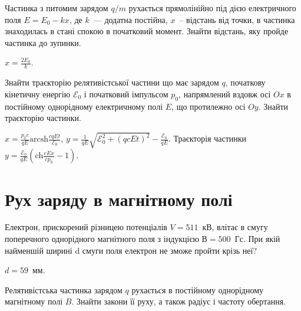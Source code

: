 \begin{problem}
Частинка з питомим зарядом $q/m$ рухається  прямолінійно під дією електричного поля $E = E_0 - kx$, де $k$~--- додатна постійна, $x$~-- відстань від точки, в частинка знаходилась в стані спокою в початковий момент. Знайти відстань, яку пройде частинка до зупинки.
\begin{solution}
	$x = \frac{2E_0}{k}$.
\end{solution}
\end{problem}

\begin{problem}
Знайти траєкторію релятивістської частини що має зарядом $q$, початкову кінетичну енергію $\mathcal{E}_0$ і початковий імпульсом $p_0$, напрямлений вздовж осі $Ox$
в постійному однорідному електричному полі $E$, що протилежно осі $Oy$. Знайти траєкторію частинки.
\begin{solution}
	$x = \frac{p_0c}{qE} \mathrm{arcsh}\frac{cqEt}{\mathcal{E}_0}$, $y = \frac{1}{qE}\sqrt{\mathcal{E}_0^2 + (qcEt)^2} - \frac{\mathcal{E}_0}{qE}$. Траєкторія частинки $y = \frac{\mathcal{E}_0}{qE} \left( \mathrm{ch}\frac{eEx}{cp_0} - 1\right) $.
\end{solution}
\end{problem}

\section{Рух заряду в магнітному полі}

\begin{problem}%
    Електрон, прискорений різницею потенціалів $V = 511$~кВ, влітає в смугу поперечного однорідного магнітного поля з індукцією $В = 500$~Гс.
    При якій найменшій ширині d смуги поля електрон не зможе пройти крізь неї?
\begin{solution}
    $d = 59$~мм.
\end{solution}
\end{problem}

\begin{problem}
Релятивістська частинка зарядом $q$ рухається в постійному однорідному магнітному полі $B$. Знайти закони її руху, а також радіус і частоту обертання.
\end{problem}

